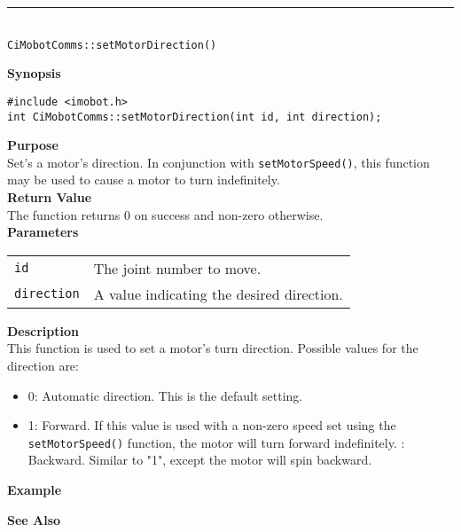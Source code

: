 \noindent
\vspace{5pt}
\rule{4.5in}{0.015in}\\
\noindent
{\LARGE \texttt{CiMobotComms::setMotorDirection()}}\\
{}

\noindent
{\bf Synopsis}\\
\begin{verbatim}
#include <imobot.h>
int CiMobotComms::setMotorDirection(int id, int direction);
\end{verbatim}

\noindent
{\bf Purpose}\\
Set's a motor's direction. In conjunction with \texttt{setMotorSpeed()}, this
function may be used to cause a motor to turn indefinitely.\\

\noindent
{\bf Return Value}\\
The function returns 0 on success and non-zero otherwise.\\

\noindent
{\bf Parameters}
\vspace{-0.1in}
\begin{description}
\item               
\begin{tabular}{p{20 mm}p{145 mm}}
\texttt{id} & The joint number to move. \\
\texttt{direction} & A value indicating the desired direction.
\end{tabular}
\end{description}

\noindent
{\bf Description}\\
This function is used to set a motor's turn direction. Possible values for the
direction are:
\begin{itemize}
\item 0: Automatic direction. This is the default setting. 
\item 1: Forward. If this value is used with a non-zero speed set using the
\texttt{setMotorSpeed()} function, the motor will turn forward indefinitely.
: Backward. Similar to "1", except the motor will spin backward.
\end{itemize}

\noindent
{\bf Example}\\
\noindent

\noindent
{\bf See Also}\\

